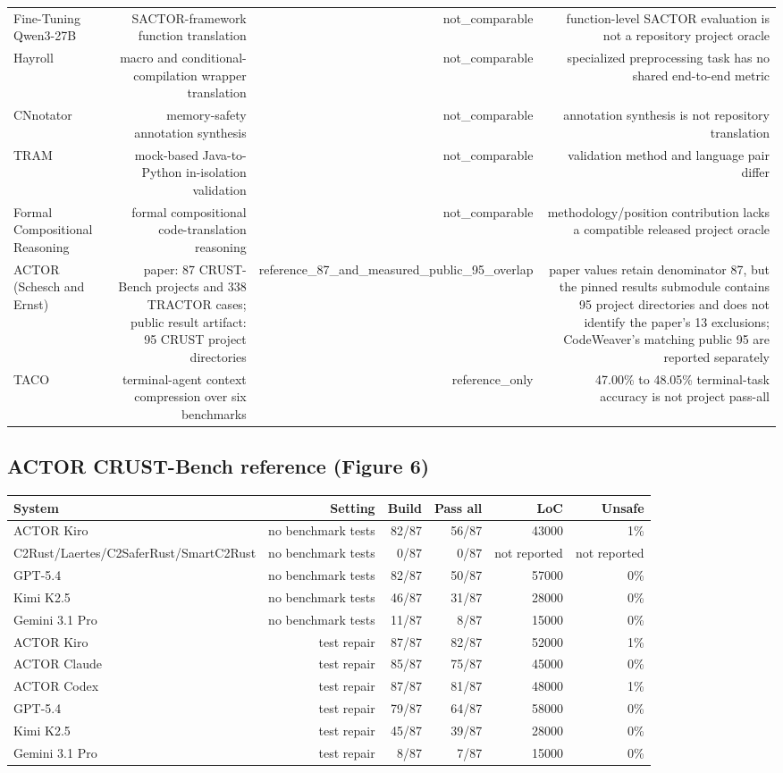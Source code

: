 \documentclass{article}
\begin{document}
\begin{tabular}{lrrr}
Fine-Tuning Qwen3-27B & SACTOR-framework function translation & not\_comparable & function-level SACTOR evaluation is not a repository project oracle \\
Hayroll & macro and conditional-compilation wrapper translation & not\_comparable & specialized preprocessing task has no shared end-to-end metric \\
CNnotator & memory-safety annotation synthesis & not\_comparable & annotation synthesis is not repository translation \\
TRAM & mock-based Java-to-Python in-isolation validation & not\_comparable & validation method and language pair differ \\
Formal Compositional Reasoning & formal compositional code-translation reasoning & not\_comparable & methodology/position contribution lacks a compatible released project oracle \\
ACTOR (Schesch and Ernst) & paper: 87 CRUST-Bench projects and 338 TRACTOR cases; public result artifact: 95 CRUST project directories & reference\_87\_and\_measured\_public\_95\_overlap & paper values retain denominator 87, but the pinned results submodule contains 95 project directories and does not identify the paper's 13 exclusions; CodeWeaver's matching public 95 are reported separately \\
TACO & terminal-agent context compression over six benchmarks & reference\_only & 47.00\% to 48.05\% terminal-task accuracy is not project pass-all \\
\bottomrule
\end{tabular}

\subsection*{ACTOR CRUST-Bench reference (Figure 6)}

\begin{tabular}{lrrrrr}
\toprule
System & Setting & Build & Pass all & LoC & Unsafe \\
\midrule
ACTOR Kiro & no benchmark tests & 82/87 & 56/87 & 43000 & 1\% \\
C2Rust/Laertes/C2SaferRust/SmartC2Rust & no benchmark tests & 0/87 & 0/87 & not reported & not reported \\
GPT-5.4 & no benchmark tests & 82/87 & 50/87 & 57000 & 0\% \\
Kimi K2.5 & no benchmark tests & 46/87 & 31/87 & 28000 & 0\% \\
Gemini 3.1 Pro & no benchmark tests & 11/87 & 8/87 & 15000 & 0\% \\
ACTOR Kiro & test repair & 87/87 & 82/87 & 52000 & 1\% \\
ACTOR Claude & test repair & 85/87 & 75/87 & 45000 & 0\% \\
ACTOR Codex & test repair & 87/87 & 81/87 & 48000 & 1\% \\
GPT-5.4 & test repair & 79/87 & 64/87 & 58000 & 0\% \\
Kimi K2.5 & test repair & 45/87 & 39/87 & 28000 & 0\% \\
Gemini 3.1 Pro & test repair & 8/87 & 7/87 & 15000 & 0\% \\
\bottomrule
\end{tabular}
\end{document}
